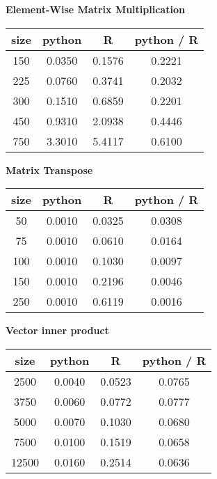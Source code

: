 \documentclass[11pt]{article}
\begin{document}
\begin{center}
    \textbf{Element-Wise Matrix Multiplication} \\
\begin{tabular}{cccc}
size  & python  &  R       & python / R \\
  \hline
150   & 0.0350  &  0.1576  &  0.2221 \\
225   & 0.0760  &  0.3741  &  0.2032 \\
300   & 0.1510  &  0.6859  &  0.2201 \\
450   & 0.9310  &  2.0938  &  0.4446 \\
750   & 3.3010  &  5.4117  &  0.6100 \\
\end{tabular}
\end{center}


\begin{center}
    \textbf{Matrix Transpose} \\
\begin{tabular}{cccc}
size  & python  &  R       & python / R \\
  \hline
50  & 0.0010  & 0.0325 & 0.0308 \\
75  & 0.0010  & 0.0610 & 0.0164 \\
100 & 0.0010  & 0.1030 & 0.0097 \\
150 & 0.0010  & 0.2196 & 0.0046 \\
250 & 0.0010  & 0.6119 & 0.0016 \\
\end{tabular}
\end{center}


\begin{center}
    \textbf{Vector inner product} \\
\begin{tabular}{cccc}
size  & python  &  R       & python / R \\
  \hline
2500  & 0.0040 & 0.0523 & 0.0765 \\
3750  & 0.0060 & 0.0772 & 0.0777 \\
5000  & 0.0070 & 0.1030 & 0.0680 \\
7500  & 0.0100 & 0.1519 & 0.0658 \\
12500 & 0.0160 & 0.2514 & 0.0636 \\
\end{tabular}
\end{center}
\end{document}
